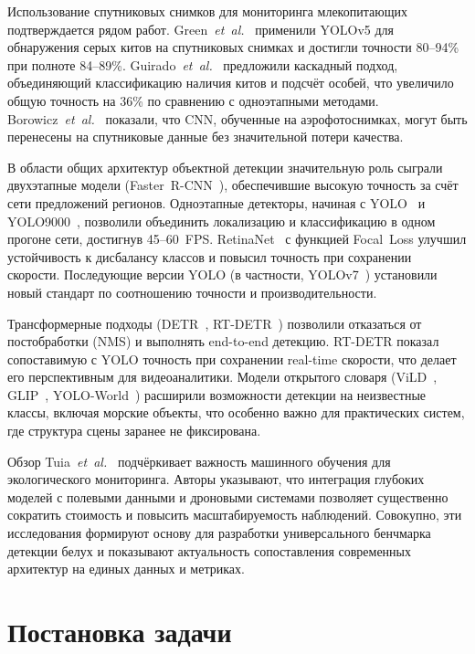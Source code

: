 \documentclass{article}
\begin{document}
Использование спутниковых снимков для мониторинга млекопитающих подтверждается рядом работ.
Green~\textit{et~al.}~\cite{green2023gray} применили YOLOv5 для обнаружения серых китов на спутниковых снимках и достигли точности 80–94\% при полноте 84–89\%.
Guirado~\textit{et~al.}~\cite{guirado2019whale_count} предложили каскадный подход, объединяющий классификацию наличия китов и подсчёт особей, что увеличило общую точность на 36\% по сравнению с одноэтапными методами.
Borowicz~\textit{et~al.}~\cite{borowicz2019aerial} показали, что CNN, обученные на аэрофотоснимках, могут быть перенесены на спутниковые данные без значительной потери качества.

В области общих архитектур объектной детекции значительную роль сыграли двухэтапные модели (Faster~R-CNN~\cite{ren2015fasterrcnn}), обеспечившие высокую точность за счёт сети предложений регионов.
Одноэтапные детекторы, начиная с YOLO~\cite{redmon2016yolo} и YOLO9000~\cite{redmon2017yolo9000}, позволили объединить локализацию и классификацию в одном прогоне сети, достигнув 45–60~FPS.
RetinaNet~\cite{lin2017focal} с функцией Focal~Loss улучшил устойчивость к дисбалансу классов и повысил точность при сохранении скорости.
Последующие версии YOLO (в частности, YOLOv7~\cite{wang2022yolov7}) установили новый стандарт по соотношению точности и производительности.

Трансформерные подходы (DETR~\cite{carion2020end}, RT-DETR~\cite{zhao2023rtdetr}) позволили отказаться от постобработки (NMS) и выполнять end-to-end детекцию. RT-DETR показал сопоставимую с YOLO точность при сохранении real-time скорости, что делает его перспективным для видеоаналитики.
Модели открытого словаря (ViLD~\cite{gu2021vild}, GLIP~\cite{li2022glip}, YOLO-World~\cite{cheng2024yoloworld}) расширили возможности детекции на неизвестные классы, включая морские объекты, что особенно важно для практических систем, где структура сцены заранее не фиксирована.

Обзор Tuia~\textit{et~al.}~\cite{tuia2022wildlife} подчёркивает важность машинного обучения для экологического мониторинга. Авторы указывают, что интеграция глубоких моделей с полевыми данными и дроновыми системами позволяет существенно сократить стоимость и повысить масштабируемость наблюдений.
Совокупно, эти исследования формируют основу для разработки универсального бенчмарка детекции белух и показывают актуальность сопоставления современных архитектур на единых данных и метриках.

\section{Постановка задачи}
\label{sec:problem}
\end{document}
